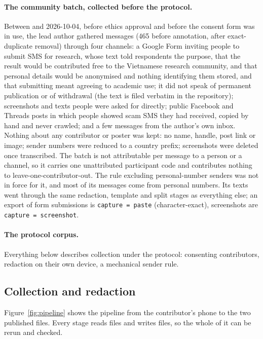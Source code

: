 \paragraph{The community batch, collected before the protocol.} Between  and
2026-10-04, before ethics approval and before the consent form was in use, the lead author
gathered  messages (465 before annotation, after exact-duplicate
removal) through four channels: a Google Form inviting people to submit SMS for research, whose text told respondents the
purpose, that the result would be contributed free to the Vietnamese research community, and
that personal details would be anonymised and nothing identifying them stored, and that
submitting meant agreeing to academic use; it did not speak of permanent publication or of
withdrawal (the text is filed verbatim in the repository); screenshots and texts people were asked
for directly; public Facebook and Threads posts in which people showed scam SMS they had received,
copied by hand and never crawled; and a few messages from the author's own inbox. Nothing about any
contributor or poster was kept: no name, handle, post link or image; sender numbers were reduced to
a country prefix; screenshots were deleted once transcribed. The batch is not attributable per
message to a person or a channel, so it carries one unattributed participant code and contributes
nothing to leave-one-contributor-out. The rule excluding personal-number senders was not in force
for it, and most of its messages come from personal numbers. Its texts went through the same
redaction, template and split stages as everything else; an export of form submissions is
\texttt{capture = paste} (character-exact), screenshots are \texttt{capture = screenshot}.

\paragraph{The protocol corpus.} Everything below describes collection under the protocol:
consenting contributors, redaction on their own device, a mechanical sender rule. 

\subsection*{Collection and redaction}
Figure~\ref{fig:pipeline} shows the pipeline from the contributor's phone to the two published
files. Every stage reads files and writes files, so the whole of it can be rerun and checked.

